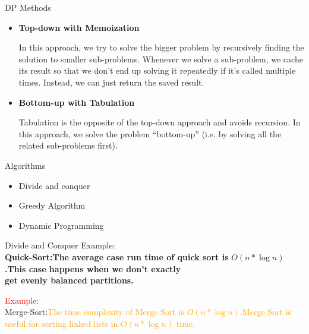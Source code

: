\documentclass{beamer}[10pt]
\begin{document}
\begin{frame}{DP Methods}

\begin{itemize}
    \item \textbf{Top-down with Memoization}
    \begin{block}{1}
    In this approach, we try to solve the bigger problem by recursively finding the solution to smaller sub-problems. Whenever we solve a sub-problem, we cache its result so that we don’t end up solving it repeatedly if it’s called multiple times. Instead, we can just return the saved result.

    \end{block}
    
    \item <2-> \textbf{Bottom-up with Tabulation}
    \begin{alertblock}{2}
    Tabulation is the opposite of the top-down approach and avoids recursion. In this approach, we solve the problem “bottom-up” (i.e. by solving all the related sub-problems first).

    
    \end{alertblock}
\end{itemize}
    
\end{frame}

\begin{frame}{Algorithms}
\label{Algorithms}
\begin{itemize}
    \item Divide and conquer \pause
    \item Greedy Algorithm \pause
    \item Dynamic Programming 
\end{itemize}
    
\end{frame}

\begin{frame}{Divide and Conquer}
{Example:\\
\textbf{Quick-Sort:The average case run time of quick sort is} $O(n*\log n)$\textbf{.This case happens when we don't exactly \\ get evenly balanced partitions.}}

{\textcolor{red}{Example:} \\
Merge-Sort:\textcolor{orange}{The time complexity of Merge Sort is $O(n*\log n)$.Merge Sort is useful for sorting linked lists in $O(n*\log n)$ time.}}
    
\end{frame}
\end{document}
